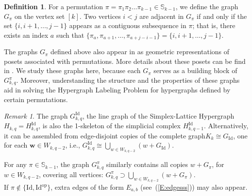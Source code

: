 \documentclass{birkjour}
\theoremstyle{definition}
\newtheorem{defn}[thm]{Definition}
\theoremstyle{remark}
\newtheorem{rem}[thm]{Remark}
\numberwithin{equation}{section}
\begin{document}
\begin{defn}
For a permutation $\pi=\pi_1\pi_2\ldots\pi_{k-1}\in
\mathbb{S}_{k-1}$, we define the graph $G_{\pi}$ on the vertex set
$[k]$. Two vertices $i<j$ are adjacent in $G_{\pi}$ if and only if
the set $\{i,i+1,\ldots,j-1\}$ appears as a contiguous subsequence
in $\pi$; that is, there exists an index $a$ such that
$\{\pi_a,\pi_{a+1},\ldots,\pi_{a+j-i-1}\}=\{i,i+1,\ldots,j-1\}$.
\end{defn}
 The graphs $G_\pi$ defined above also
appear
 in \cite{Bag} as geometric representations
 of posets associated with permutations.
  More details about these posets can be
find in \cite{Tenner}. We study these graphs here, because each
$G_{\pi}$ serves as a building block of $G^{\pi}_{k,q}$. Moreover,
understanding the structure and the properties of these graphs aid
in solving the Hypergraph Labeling Problem for hypergraphs defined
by certain permutations.

\begin{rem}
The graph $G^{\mathrm{Id}}_{k,q}$, the line graph of the
Simplex-Lattice Hypergraph $H_{k,q} = H^{\mathrm{Id}}_{k,q}$, is
also the 1-skeleton of the simplicial complex $
H^{\mathrm{Id}}_{k,q-1}$. Alternatively, it can be assembled from
edge-disjoint copies of the complete graph$K_k \cong
G_{\mathrm{Id}}$, one for each $\mathbf{w} \in W_{k,q-2}$, i.e.,
$G^{\mathrm{Id}}_{k,q} \cong \bigcup_{w \in W_{k,q-2}} (w +
G_{\mathrm{Id}})$.

For any $\pi \in \mathbb{S}_{k-1}$, the graph $G^\pi_{k,q}$
similarly contains all copies $ w + G_\pi$, for $w \in W_{k,q-2}
$, covering all vertices: $ G^\pi_{k,q} \supset \bigcup_{w \in
W_{k,q-2}} (w + G_\pi)$. \\If $ \pi \notin \{ \mathrm{Id},
\mathrm{Id}^{\mathrm{op}} \} $, extra edges of the form $ E_{a,b}$
(see~(\ref{E:edgesss})) may also appear.
\end{rem}
\end{document}
